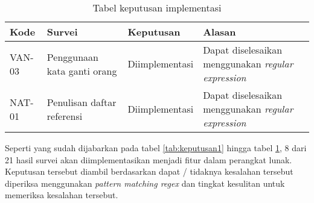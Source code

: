 \begin{table}[H]
	\renewcommand{\arraystretch}{1.5}
	\caption {Tabel keputusan implementasi} \label{tab:keputusan4}
	\begin{center}
		\begin{tabular}{|p{1.5 cm}|>{\raggedright} p{4 cm}| p{2.5 cm}| p{6.5 cm}|}
		\hline
		Kode & Survei & Keputusan & Alasan \\ 
		\hline 
		VAN-03 & Penggunaan kata ganti orang & Diimplementasi & Dapat diselesaikan menggunakan \textit{regular expression} \newline \\ 
		\hline 
		NAT-01 & Penulisan daftar referensi & Diimplementasi & Dapat diselesaikan menggunakan \textit{regular expression} \newline \\ 
		\hline 
		\end{tabular}
	\end{center}
\end{table}

Seperti yang sudah dijabarkan pada tabel \ref{tab:keputusan1} hingga tabel \ref{tab:keputusan4}, 8 dari 21 hasil survei akan diimplementasikan menjadi fitur dalam perangkat lunak. Keputusan tersebut diambil berdasarkan dapat / tidaknya kesalahan tersebut diperiksa menggunakan \textit{pattern matching regex} dan tingkat kesulitan untuk memeriksa kesalahan tersebut.